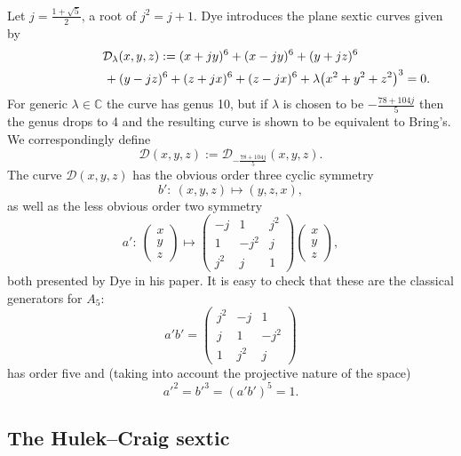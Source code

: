 \documentclass[pdftex]{sigma}
\numberwithin{equation}{section}
\begin{document}
Let $j = \frac{1+\sqrt{5}}{2}$, a root of $j^2=j+1$. Dye \cite{dye} introduces
 the plane sextic curves given by
\begin{gather*}
  \mathcal{D}_\lambda(x,y,z) :=
  (x+jy)^6 + (x-jy)^6 + (y+jz)^6  \\
\hphantom{\mathcal{D}_\lambda(x,y,z) :=}{}    + (y-jz)^6 + (z+jx)^6 + (z-jx)^6 + \lambda\big(x^2+y^2+z^2\big)^3 = 0.
\end{gather*}
For generic $\lambda\in\mathbb{C}$ the curve has genus 10, but if
$\lambda$ is chosen to be $-\frac{78+104j}{5}$ then the genus drops to
4 and the resulting curve is shown to be equivalent to Bring's. We
correspondingly def\/ine
\[
  \mathcal{D}(x,y,z) := \mathcal{D}_{-\frac{78+104j}{5}}(x,y,z).
\]
The curve $\mathcal{D}(x,y,z)$ has the obvious order three cyclic symmetry
\[ b' : \ (x,y,z) \mapsto (y,z,x), \]
as well as the less obvious order two symmetry
\[ a' : \
  \begin{pmatrix}
    x\\y\\z
  \end{pmatrix}
  \mapsto
  \begin{pmatrix}
    -j  & 1    & j^2 \\
    1   & -j^2 & j \\
    j^2 & j    & 1
  \end{pmatrix}
  \begin{pmatrix}
    x\\y\\z
  \end{pmatrix},
\]
both presented by Dye in his paper. It is easy to check that these are the
classical generators for $A_5$:
\begin{equation*}
  a'b' =
  \begin{pmatrix}
    j^2 & -j  & 1 \\
    j   & 1   & -j^2 \\
    1   & j^2 & j
  \end{pmatrix}
\end{equation*}
has order f\/ive and (taking into account the projective nature of the
space)
\[ a'^2 = b'^3 = (a'b')^5 = 1. \]

\subsection[The Hulek--Craig sextic]{The Hulek--Craig sextic}\label{section2.2}
\end{document}
